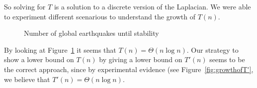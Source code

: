 \documentclass[runningheads,a4paper]{llncs}
\begin{document}
So solving for $T$ is a solution to a discrete version of the Laplacian. We were able to experiment different scenarious to understand the growth of $T(n)$. 
\begin{figure}[!ht]
\centering
{} \qquad
{}
\caption{Number of global earthquakes until stability}
\label{fig:growthofT}
\end{figure}
By looking at Figure~\ref{fig:growthofT} it seems that $T(n) = \Theta(n\log n)$. Our strategy to show a lower bound on $T(n)$ by giving a lower bound on $T'(n)$ seems to be the correct approach, since by experimental evidence (see Figure~\ref{fig:growthofT'}, we believe that $T'(n) = \Theta(n\log n)$.
\end{document}
